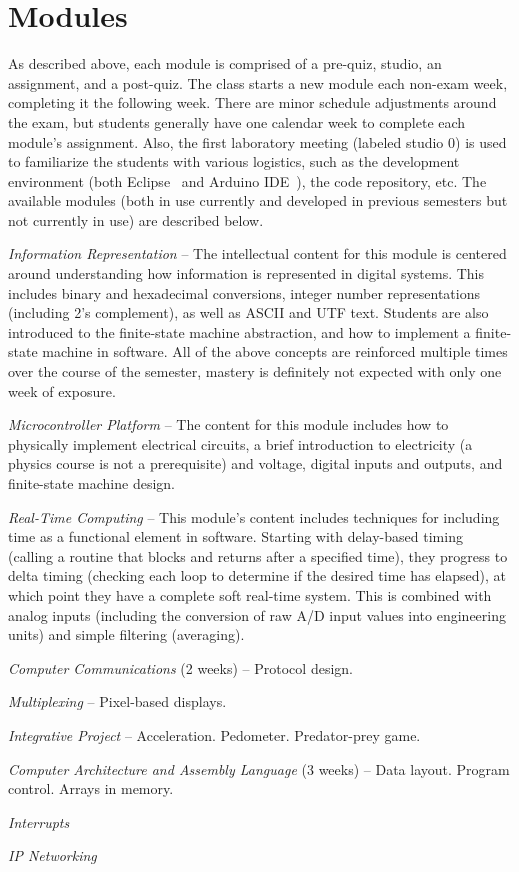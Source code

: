 \section{Modules}
\label{sec:weeks}

As described above, each module is comprised of a pre-quiz, studio,
an assignment, and a post-quiz.  The class starts a new module each
non-exam week, completing it the following week. There are minor schedule
adjustments around the exam, but students generally have one calendar week
to complete each module's assignment.
Also, the first laboratory meeting (labeled studio 0) is used to familiarize
the students with various logistics, such as the development environment
(both Eclipse~\cite{eclipse} and Arduino IDE~\cite{arduino}),
the code repository, etc.
The available modules
(both in use currently and developed in previous semesters but not
currently in use) are described below.

\emph{Information Representation} --
The intellectual content for this module is centered around understanding
how information is represented in digital systems. This includes binary and
hexadecimal conversions, integer
number representations (including 2's complement), as well as
ASCII and UTF text.
Students are also introduced to the finite-state machine abstraction,
and how to implement a finite-state machine in software.
All of the above concepts are reinforced multiple times over the course
of the semester, mastery is definitely not expected with only one week
of exposure.

\emph{Microcontroller Platform} --
The content for this module includes how to physically implement electrical
circuits, a brief introduction to electricity (a physics course is not a
prerequisite) and voltage, digital inputs and outputs, and finite-state
machine design.

\emph{Real-Time Computing} --
This module's content includes techniques for including time as a functional
element in software. Starting with delay-based timing (calling a routine
that blocks and returns after a specified time), they progress to delta
timing (checking each loop to determine if the desired time has elapsed),
at which point they have a complete soft real-time system.
This is combined with analog inputs (including the conversion of raw A/D
input values into engineering units) and simple filtering (averaging).

\emph{Computer Communications} (2 weeks) -- Protocol design.

\emph{Multiplexing} -- Pixel-based displays.

\emph{Integrative Project} -- Acceleration. Pedometer. Predator-prey game.

\emph{Computer Architecture and Assembly Language} (3 weeks) -- Data layout.
Program control. Arrays in memory.


\emph{Interrupts}

\emph{IP Networking}
